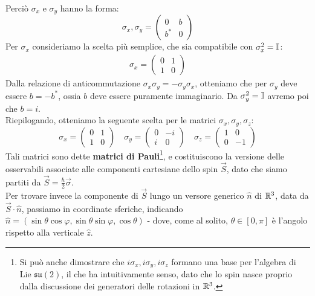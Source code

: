 \documentclass[../../FisicaTeorica.tex]{subfiles}
\begin{document}
Perciò $\sigma_x$ e $\sigma_y$ hanno la forma:
\[
\sigma_x, \sigma_y =
\begin{pmatrix}
0 & b\\
b^* & 0
\end{pmatrix}
\]
Per $\sigma_x$ consideriamo la scelta più semplice, che sia compatibile con $\sigma_x^2 = \mathbb{I}$:
\begin{align*}
\sigma_x = \begin{pmatrix}
0 & 1\\
1 & 0
\end{pmatrix}
\end{align*}
Dalla relazione di anticommutazione $\sigma_x\sigma_y = -\sigma_y\sigma_x$, otteniamo che per $\sigma_y$ deve essere $b=-b^*$, ossia $b$ deve essere puramente immaginario. Da $\sigma_y^2 = \mathbb{I}$ avremo poi che $b=i$.\\
Riepilogando, otteniamo la seguente scelta per le matrici $\sigma_x, \sigma_y, \sigma_z$:
\[
\sigma_x = \begin{pmatrix}
0 & 1\\
1 & 0
\end{pmatrix}
\quad
\sigma_y = \begin{pmatrix}
0 & -i\\
i & 0
\end{pmatrix} \quad
\sigma_z = \begin{pmatrix}
1 & 0\\
0 & -1
\end{pmatrix}
\]
Tali matrici sono dette \textbf{matrici di Pauli}\footnote{Si può anche dimostrare che $i\sigma_x, i\sigma_y, i\sigma_z$ formano una base per l'algebra di Lie $\mathfrak{su}(2)$, il che ha intuitivamente senso, dato che lo spin nasce proprio dalla discussione dei generatori delle rotazioni in $\mathbb{R}^3$.}, e costituiscono la versione  delle osservabili associate alle componenti cartesiane dello spin $\vec{S}$, dato che siamo partiti da $\vec{S}=\frac{\hbar}{2}\vec{\sigma}$.\\
Per trovare invece la componente di $\vec{S}$ lungo un versore generico $\hat{n}$ di $\mathbb{R}^3$, data da $\vec{S}\cdot \hat{n}$, passiamo in coordinate sferiche, indicando $\hat{n} = (\sin\theta\cos\varphi, \sin\theta\sin\varphi,\cos\theta)$ - dove, come al solito, $\theta \in [0,\pi]$ è l'angolo rispetto alla verticale $\hat{z}$.
\end{document}
